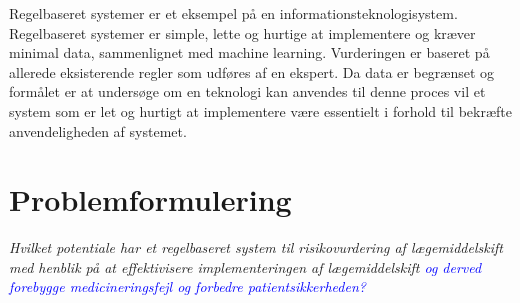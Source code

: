 Regelbaseret systemer er et eksempel på en informationsteknologisystem. Regelbaseret systemer er simple, lette og hurtige at implementere og kræver minimal data, sammenlignet med machine learning. Vurderingen er baseret på allerede eksisterende regler som udføres af en ekspert. Da data er begrænset og formålet er at undersøge om en teknologi kan anvendes til denne proces vil et system som er let og hurtigt at implementere være essentielt i forhold til bekræfte anvendeligheden af systemet. 



\section{Problemformulering}



\textit{Hvilket potentiale har et regelbaseret system til risikovurdering af lægemiddelskift med henblik på at effektivisere implementeringen af lægemiddelskift \textcolor{blue}{og derved forebygge medicineringsfejl og forbedre patientsikkerheden?}} 

